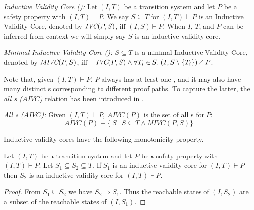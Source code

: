 \begin{definition}{\emph{Inductive Validity Core (\ivc):}}
  \label{def:ivc}
  Let $(I, T)$ be a transition system and let $P$ be a
  safety property with $(I, T)\vdash P$.
  We say $S \subseteq T$ for $(I, T)\vdash P$ is an Inductive Validity Core,
  denoted by $\textit{IVC}(P, S)$, iff $(I, S) \vdash P $.
  When $I$, $T$, and $P$ can be inferred from
  context we will simply say $S$ is an inductive validity core.
\end{definition}

\begin{definition}{\emph{Minimal Inductive Validity Core (\mivc):}}
  \label{def:minimal-ivc}
  $S \subseteq T$ is a minimal Inductive Validity Core,
  denoted by $\textit{MIVC}(P, S)$, iff ~
  $\textit{IVC}(P, S) \wedge \forall T_i \in S.~ (I, S\setminus\{ T_i \}) \nvdash P$.
\end{definition}

Note that, given $(I, T) \vdash P$, $P$ always has at least one \mivc, and it may also have many distinct {\mivc}s corresponding to different proof paths. To capture the latter, the \emph{all {\mivc}s ($AIVC$)} relation has been introduced in \cite{Murugesan16:renext}.
\begin{definition}{\emph{All {\mivc}s ($AIVC$):}}
    \label{def:allivcs}
    Given $(I, T) \vdash P$, $AIVC(P)$ is the set of all \mivc s for $P$:
    $$ AIVC(P) \equiv  \{\ S~|~S \subseteq T \land  MIVC(P, S)\} $$
\end{definition}

Inductive validity cores have the following monotonicity property.

\begin{lemma}
  \label{lem:ivc-monotonic}
  Let $(I, T)$ be a transition system and let $P$ be a safety property
  with $(I, T)\vdash P$. Let $S_1 \subseteq S_2 \subseteq T$. If $S_1$
  is an inductive validity core for $(I, T)\vdash P$ then $S_2$ is an
  inductive validity core for $(I, T)\vdash P$.
\end{lemma}
\begin{proof}
  From $S_1 \subseteq S_2$ we have $S_2 \Rightarrow S_1$. Thus the
  reachable states of $(I, S_2)$ are a subset of the reachable states
  of $(I, S_1)$.
\end{proof}

